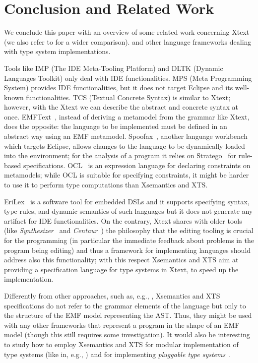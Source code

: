 \section{Conclusion and Related Work}
\label{sec:conclusion}

We conclude this paper with an overview of some related work concerning Xtext
(we also refer to \cite{PP08} for a wider comparison).
and other language frameworks dealing with type system implementations.

\newcommand{\xtypes}{XTypeS}
\newcommand{\xtext}{Xtext}

Tools like IMP (The IDE Meta-Tooling Platform) \cite{imp09} and DLTK (Dynamic
Languages Toolkit) \cite{DLTK} only deal with IDE functionalities.
MPS (Meta Programming System) \cite{MPS} provides IDE functionalities, but it
does not target Eclipse and its well-known functionalities.
TCS (Textual Concrete Syntax) \cite{tcs} is similar to \xtext; however, with the
Xtext we can describe the abstract and concrete syntax at once.
EMFText~\cite{emftext09}, instead of deriving a metamodel from the grammar like
Xtext, does the opposite:
the language to be implemented must be defined in an abstract way using an EMF
metamodel.  Spoofax~\cite{Spoofax2010}, another language workbench which targets
Eclipse, allows changes to the language to be dynamically loaded into the
environment; for the analysis of a program it relies on
Stratego~\cite{Stratego2008} for rule-based specifications.
OCL~\cite{WarmerKleppe99,OCLOMG} is an expression language for declaring
constraints on metamodels; while OCL is suitable for specifying constraints, it
might be harder to use it to perform type computations than Xsemantics and XTS.

EriLex~\cite{EriLex} is a software tool for embedded DSLs and it supports
specifying syntax, type rules, and dynamic semantics of such languages but it
does not generate any artifact for IDE functionalities.
On the contrary, \xtext{} shares with older tools (like
\emph{Synthesizer}~\cite{Synthesizer} and \emph{Centaur}~\cite{Centaur}) the
philosophy that the editing tooling is crucial for the programming (in
particular the immediate feedback about problems in the program being editing)
and thus a framework for implementing languages should address also this
functionality; with this respect Xsemantics and XTS aim at providing a
specification language for type systems in Xtext, to speed up the
implementation.

Differently from other approaches, such as, e.g.,
\cite{Centaur,MPS,ASFSDF,Ruler,PLTRedex,EriLex,Neverlang2010}, Xsemantics and
XTS specifications do not refer to the grammar elements of the language but only
to the structure of the EMF model representing the AST.  Thus, they might be
used with any other frameworks that represent a program in the shape of an EMF
model (though this still requires some investigation).
It would also be interesting to study how to employ Xsemantics and XTS for
modular implementation of type systems (like in, e.g.,
\cite{JastAdd,Neverlang2010,Spoofax2010}) and for implementing \emph{pluggable
type systems}~\cite{Brac04a}.

